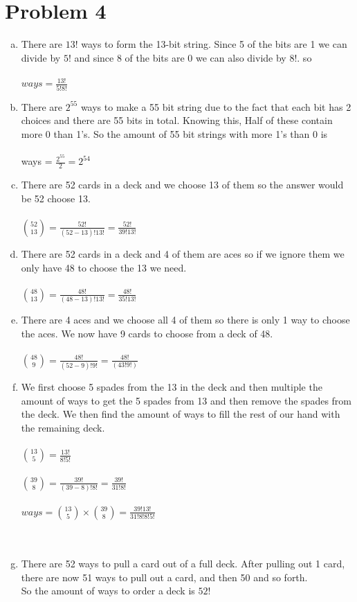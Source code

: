 \documentclass[11pt,letterpaper]{article}
\begin{document}
\section*{Problem 4}
\begin{enumerate}[(a)]
\item
There are $13!$ ways to form the 13-bit string. Since 5 of the bits are 1 we can divide by $5!$ and since 8 of the bits are 0 we can also divide by $8!$.
so\\\\ $ways = \frac{13!}{5!8!}$
\item
There are $2^{55}$ ways to make a 55 bit string due to the fact that each bit has 2 choices and there are 55 bits in total. Knowing this, Half of these contain more 0 than 1's. So the amount of 55 bit strings with more 1's than 0 is \\\\ways = $\frac{2^{55}}{2} = 2^{54}$
\item
There are 52 cards in a deck and we choose 13 of them so the answer would be 52 choose 13.\\\\ ${52\choose 13} = \frac{52!}{(52-13)!13!} = \frac{52!}{39!13!}$\\
\item
There are 52 cards in a deck and 4 of them are aces so if we ignore them we only have 48 to choose the 13 we need.\\\\
${48\choose 13} = \frac{48!}{(48-13)!13!} = \frac{48!}{35!13!}$\\
\item
There are 4 aces and we choose all 4 of them so there is only 1 way to choose the aces. We now have 9 cards to choose from a deck of 48.\\\\
${48\choose 9} = \frac{48!}{(52-9)!9!} = \frac{48!}{(43!9!)}$\\
\item
We first choose 5 spades from the 13 in the deck and then multiple the amount of ways to get the 5 spades from 13 and then remove the spades from the deck. We then find the amount of ways to fill the rest of our hand with the remaining deck.\\\\
${13\choose5} = \frac{13!}{8!5!}$\\\\
${39\choose8} = \frac{39!}{(39-8)!8!} = \frac{39!}{31!8!}$\\\\
$ways = {13\choose5}\times {39\choose8} = \frac{39!13!}{31!8!8!5!}$\\\\\
\item
There are 52 ways to pull a card out of a full deck. After pulling out 1 card, there are now 51 ways to pull out a card, and then 50 and so forth.\\
So the amount of ways to order a deck is $52!$\\


\end{enumerate}
\end{document}
